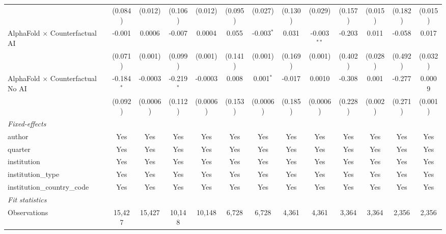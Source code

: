 \begin{tabular}{lcccccccccccc}
                                            & (0.084)      & (0.012)       & (0.106)      & (0.012)       & (0.095) & (0.027)      & (0.130) & (0.029)       & (0.157) & (0.015)      & (0.182) & (0.015)\\   
   AlphaFold $\times$ Counterfactual AI     & -0.001       & 0.0006        & -0.007       & 0.0004        & 0.055   & -0.003$^{*}$ & 0.031   & -0.003$^{**}$ & -0.203  & 0.011        & -0.058  & 0.017\\   
                                            & (0.071)      & (0.001)       & (0.099)      & (0.001)       & (0.141) & (0.001)      & (0.169) & (0.001)       & (0.402) & (0.028)      & (0.492) & (0.032)\\   
   AlphaFold $\times$ Counterfactual No AI  & -0.184$^{*}$ & -0.0003       & -0.219$^{*}$ & -0.0003       & 0.008   & 0.001$^{*}$  & -0.017  & 0.0010        & -0.308  & 0.001        & -0.277  & 0.0009\\   
                                            & (0.092)      & (0.0006)      & (0.112)      & (0.0006)      & (0.153) & (0.0006)     & (0.185) & (0.0006)      & (0.228) & (0.002)      & (0.271) & (0.001)\\   
   \midrule
   \emph{Fixed-effects}\\
   author                                   & Yes          & Yes           & Yes          & Yes           & Yes     & Yes          & Yes     & Yes           & Yes     & Yes          & Yes     & Yes\\  
   quarter                                  & Yes          & Yes           & Yes          & Yes           & Yes     & Yes          & Yes     & Yes           & Yes     & Yes          & Yes     & Yes\\  
   institution                              & Yes          & Yes           & Yes          & Yes           & Yes     & Yes          & Yes     & Yes           & Yes     & Yes          & Yes     & Yes\\  
   institution\_type                        & Yes          & Yes           & Yes          & Yes           & Yes     & Yes          & Yes     & Yes           & Yes     & Yes          & Yes     & Yes\\  
   institution\_country\_code               & Yes          & Yes           & Yes          & Yes           & Yes     & Yes          & Yes     & Yes           & Yes     & Yes          & Yes     & Yes\\  
   \midrule
   \emph{Fit statistics}\\
   Observations                             & 15,427       & 15,427        & 10,148       & 10,148        & 6,728   & 6,728        & 4,361   & 4,361         & 3,364   & 3,364        & 2,356   & 2,356\\  

\end{tabular}
